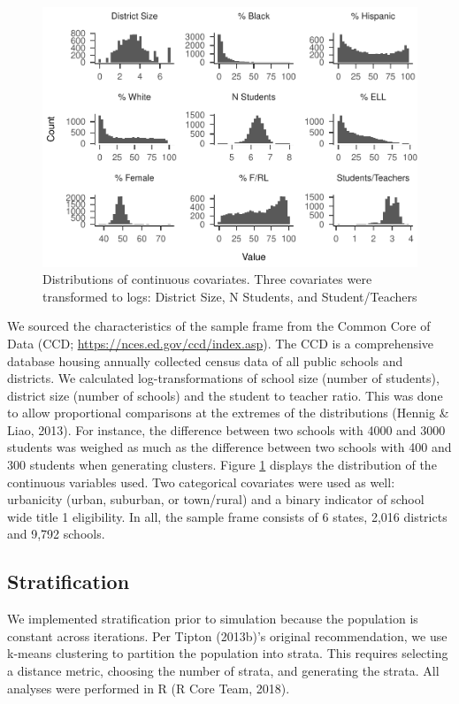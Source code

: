 \documentclass[man,floatsintext]{apa6}
\begin{document}
\begin{figure}
\centering
\includegraphics{GenSamp_Paper_files/figure-latex/plot-dist1-1.pdf}
\caption{\label{fig:plot-dist1}Distributions of continuous covariates. Three covariates were transformed to logs: District Size, N Students, and Student/Teachers}
\end{figure}

We sourced the characteristics of the sample frame from the Common Core of Data (CCD; \url{https://nces.ed.gov/ccd/index.asp}). The CCD is a comprehensive database housing annually collected census data of all public schools and districts. We calculated log-transformations of school size (number of students), district size (number of schools) and the student to teacher ratio. This was done to allow proportional comparisons at the extremes of the distributions (Hennig \& Liao, 2013). For instance, the difference between two schools with 4000 and 3000 students was weighed as much as the difference between two schools with 400 and 300 students when generating clusters. Figure \ref{fig:plot-dist1} displays the distribution of the continuous variables used. Two categorical covariates were used as well: urbanicity (urban, suburban, or town/rural) and a binary indicator of school wide title 1 eligibility. In all, the sample frame consists of 6 states, 2,016 districts and 9,792 schools.

\hypertarget{stratification}{%
\subsection{Stratification}\label{stratification}}

We implemented stratification prior to simulation because the population is constant across iterations. Per Tipton (2013b)'s original recommendation, we use k-means clustering to partition the population into strata. This requires selecting a distance metric, choosing the number of strata, and generating the strata. All analyses were performed in R (R Core Team, 2018).
\end{document}
